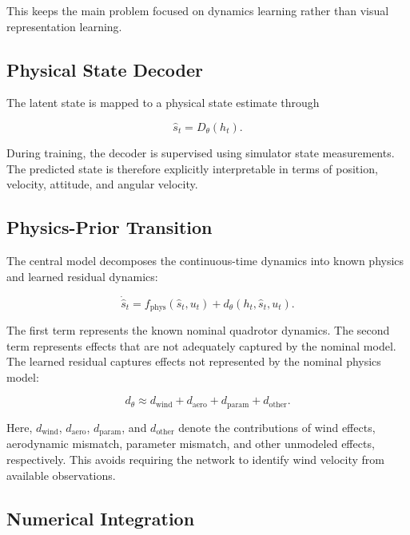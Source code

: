 \documentclass[conference]{IEEEtran}
\begin{document}
This keeps the main problem focused on dynamics learning rather than
visual representation learning.


\subsection{Physical State Decoder}

The latent state is mapped to a physical state estimate through

\begin{equation}
\hat{s}_t =
D_{\theta}(h_t).
\end{equation}

During training, the decoder is supervised using simulator state
measurements. The predicted state is therefore explicitly interpretable in terms of
position, velocity, attitude, and angular velocity.


\subsection{Physics-Prior Transition}

The central model decomposes the continuous-time dynamics into known
physics and learned residual dynamics:

\begin{equation}
\boxed{
\dot{\hat{s}}_t
=
f_{\mathrm{phys}}
(\hat{s}_t,u_t)
+
d_{\theta}
(h_t,\hat{s}_t,u_t).
}
\end{equation}

The first term represents the known nominal quadrotor dynamics. The
second term represents effects that are not adequately captured by the
nominal model. The learned residual captures effects not represented by the nominal physics model:

\begin{equation}
d_{\theta}
\approx
d_{\mathrm{wind}}
+
d_{\mathrm{aero}}
+
d_{\mathrm{param}}
+
d_{\mathrm{other}}.
\end{equation}

\noindent
Here, $d_{\mathrm{wind}}$, $d_{\mathrm{aero}}$, $d_{\mathrm{param}}$,
and $d_{\mathrm{other}}$ denote the contributions of wind effects,
aerodynamic mismatch, parameter mismatch, and other unmodeled effects,
respectively. This avoids requiring the network to identify wind velocity from
available observations.


\subsection{Numerical Integration}
\end{document}
